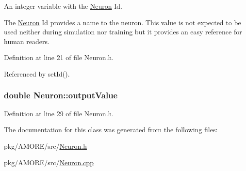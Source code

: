 An integer variable with the \hyperlink{class_neuron}{Neuron} Id. 

The \hyperlink{class_neuron}{Neuron} Id provides a name to the neuron. This value is not expected to be used neither during simulation nor training but it provides an easy reference for human readers. 

Definition at line 21 of file Neuron.h.



Referenced by setId().

\hypertarget{class_neuron_ada029047646c36e525a6a1b77cafc03c}{
\subsubsection[{outputValue}]{\setlength{\rightskip}{0pt plus 5cm}double {\bf Neuron::outputValue}}}
\label{class_neuron_ada029047646c36e525a6a1b77cafc03c}


Definition at line 29 of file Neuron.h.



The documentation for this class was generated from the following files:\begin{DoxyCompactItemize}
\item 
pkg/AMORE/src/\hyperlink{_neuron_8h}{Neuron.h}\item 
pkg/AMORE/src/\hyperlink{_neuron_8cpp}{Neuron.cpp}\end{DoxyCompactItemize}
